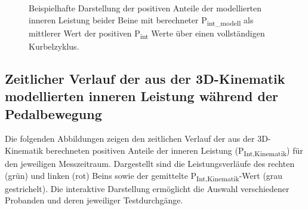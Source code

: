\documentclass[
  letterpaper,
  DIV=11]{scrartcl}
\begin{document}
\begin{figure}


\caption{\label{fig-PInt_Modell_Zyklus_positiv}Beispielhafte Darstellung
der positiven Anteile der modellierten inneren Leistung beider Beine mit
berechneter P\textsubscript{int\_modell} als mittlerer Wert der
positiven P\textsubscript{int} Werte über einen vollständigen
Kurbelzyklus.}

\end{figure}%

\subsection{Zeitlicher Verlauf der aus der 3D-Kinematik modellierten
inneren Leistung während der
Pedalbewegung}\label{zeitlicher-verlauf-der-aus-der-3d-kinematik-modellierten-inneren-leistung-wuxe4hrend-der-pedalbewegung}

Die folgenden Abbildungen zeigen den zeitlichen Verlauf der aus der
3D-Kinematik berechneten positiven Anteile der inneren Leistung
(P\textsubscript{Int,Kinematik}) für den jeweiligen Messzeitraum.
Dargestellt sind die Leistungsverläufe des rechten (grün) und linken
(rot) Beins sowie der gemittelte P\textsubscript{Int,Kinematik}-Wert
(grau gestrichelt). Die interaktive Darstellung ermöglicht die Auswahl
verschiedener Probanden und deren jeweiliger Testdurchgänge.
\end{document}
